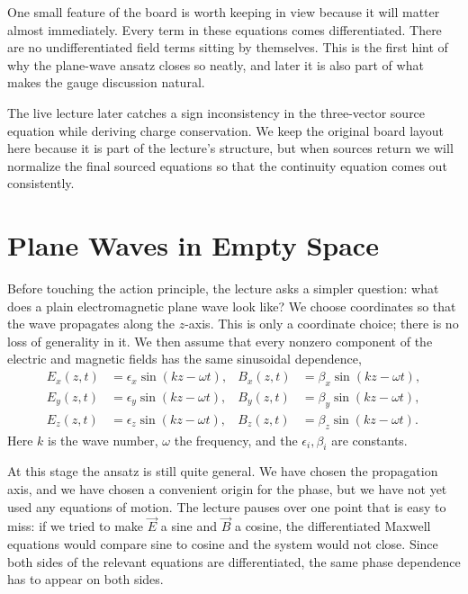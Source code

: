 One small feature of the board is worth keeping in view because it will matter almost immediately. Every term in these equations comes differentiated. There are no undifferentiated field terms sitting by themselves. This is the first hint of why the plane-wave ansatz closes so neatly, and later it is also part of what makes the gauge discussion natural.

\begin{remark}
The live lecture later catches a sign inconsistency in the three-vector source equation while deriving charge conservation. We keep the original board layout here because it is part of the lecture's structure, but when sources return we will normalize the final sourced equations so that the continuity equation comes out consistently.
\end{remark}

\section{Plane Waves in Empty Space}

Before touching the action principle, the lecture asks a simpler question: what does a plain electromagnetic plane wave look like? We choose coordinates so that the wave propagates along the \(z\)-axis. This is only a coordinate choice; there is no loss of generality in it. We then assume that every nonzero component of the electric and magnetic fields has the same sinusoidal dependence,
\begin{align}
E_x(z,t)&=\epsilon_x\sin(kz-\omega t),
&
B_x(z,t)&=\beta_x\sin(kz-\omega t),
\\
E_y(z,t)&=\epsilon_y\sin(kz-\omega t),
&
B_y(z,t)&=\beta_y\sin(kz-\omega t),
\\
E_z(z,t)&=\epsilon_z\sin(kz-\omega t),
&
B_z(z,t)&=\beta_z\sin(kz-\omega t).
\end{align}
Here \(k\) is the wave number, \(\omega\) the frequency, and the \(\epsilon_i,\beta_i\) are constants.

At this stage the ansatz is still quite general. We have chosen the propagation axis, and we have chosen a convenient origin for the phase, but we have not yet used any equations of motion. The lecture pauses over one point that is easy to miss: if we tried to make \(\vec E\) a sine and \(\vec B\) a cosine, the differentiated Maxwell equations would compare sine to cosine and the system would not close. Since both sides of the relevant equations are differentiated, the same phase dependence has to appear on both sides.

